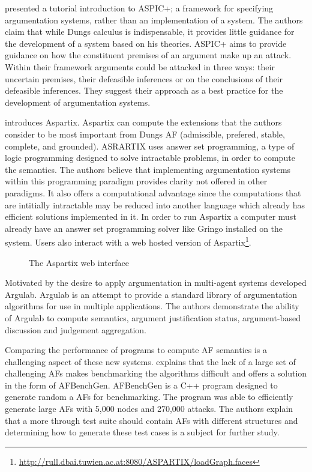 \cite{modgil2014aspic+} presented a tutorial introduction to ASPIC+; a framework for specifying argumentation systems, rather than an implementation of a system. The authors claim that while Dungs calculus is indispensable, it provides little guidance for the development of a system based on his theories. ASPIC+ aims to provide guidance on how the constituent premises of an argument make up an attack. Within their framework arguments could be attacked in three ways: their uncertain premises, their defeasible inferences or on the conclusions of their defeasible inferences. They suggest their approach as a best practice for the development of argumentation systems.

\cite{egly2008aspartix} introduces Aspartix. Aspartix can compute the extensions that the authors consider to be most important from Dungs AF (admissible, prefered, stable, complete, and grounded). ASRARTIX uses answer set programming, a type of logic programming designed to solve intractable problems, in order to compute the semantics. The authors believe that implementing argumentation systems within this programming paradigm provides clarity not offered in other paradigms. It also offers a computational advantage since the computations that are intitially intractable may be reduced into another language which already has efficient solutions implemented in it. In order to run Aspartix a computer must already have an answer set programming solver like Gringo installed on the system. Users also interact with a web hosted version of Aspartix\footnote{\url{http://rull.dbai.tuwien.ac.at:8080/ASPARTIX/loadGraph.faces}}.

\begin{figure}
    \centering
    \hfill
    \caption{The Aspartix web interface}
    \label{fig:three graphs}
\end{figure}

Motivated by the desire to apply argumentation in multi-agent systems \cite{podlaszewski2011implementation} developed Argulab. Argulab is an attempt to provide a standard library of argumentation algorithms for use in multiple applications. The authors demonstrate the ability of Argulab to compute semantics, argument justification status, argument-based discussion and judgement aggregation.

Comparing the performance of programs to compute AF semantics is a challenging aspect of these new systems. \cite{cerutti2014generating} explains that the lack of a large set of challenging AFs makes benchmarking the algorithms difficult and offers a solution in the form of AFBenchGen.
AFBenchGen is a C++ program designed to generate random a AFs for benchmarking.
The program was able to efficiently generate large AFs with 5,000 nodes and 270,000 attacks. The authors explain that a more through test suite should contain AFs with different structures and determining how to generate these test cases is a subject for further study.

